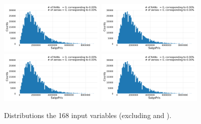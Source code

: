 \begin{figure}
  \subfloat{\qquad}
  \includegraphics[draft=false, width=0.45\textwidth, page=163, trim=15 0 15 0, clip]{figures/housing/overview_fig.pdf}\hfil
  \subfloat{\qquad}
  \includegraphics[draft=false, width=0.45\textwidth, page=164, trim=15 0 15 0, clip]{figures/housing/overview_fig.pdf}
  \subfloat{\qquad}
  \includegraphics[draft=false, width=0.45\textwidth, page=165, trim=15 0 15 0, clip]{figures/housing/overview_fig.pdf}\hfil
  \subfloat{\qquad}
  \includegraphics[draft=false, width=0.45\textwidth, page=166, trim=15 0 15 0, clip]{figures/housing/overview_fig.pdf}
  \caption[Distributions for the housing price dataset]{Distributions the 168 input variables (excluding  and ).}
  \label{fig:h:variable_overview_all_14}
  \vspace{\abovecaptionskip}
\end{figure}



